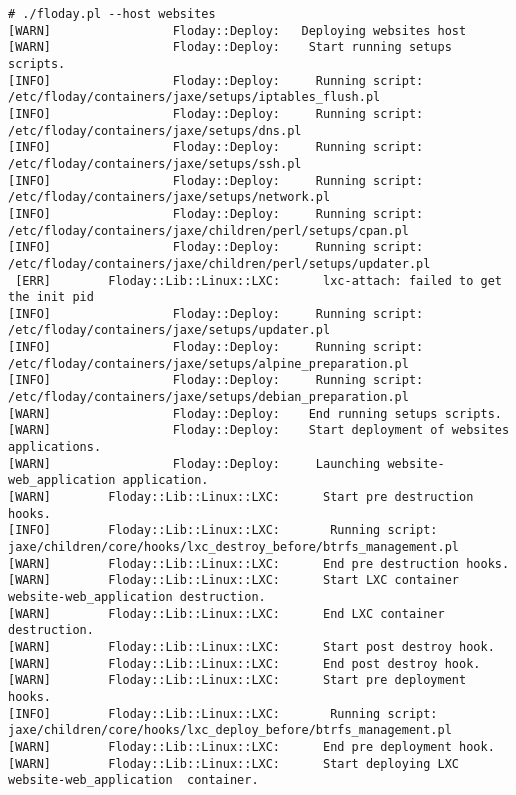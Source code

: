 \begin{lstlisting}[float=t, caption={Sortie d'une exécution de \emph{Floday}}, label=fig_1.4_floday, basicstyle=\tiny, xleftmargin=-3cm]
# ./floday.pl --host websites
[WARN]                 Floday::Deploy:   Deploying websites host
[WARN]                 Floday::Deploy:    Start running setups scripts.
[INFO]                 Floday::Deploy:     Running script: /etc/floday/containers/jaxe/setups/iptables_flush.pl
[INFO]                 Floday::Deploy:     Running script: /etc/floday/containers/jaxe/setups/dns.pl
[INFO]                 Floday::Deploy:     Running script: /etc/floday/containers/jaxe/setups/ssh.pl
[INFO]                 Floday::Deploy:     Running script: /etc/floday/containers/jaxe/setups/network.pl
[INFO]                 Floday::Deploy:     Running script: /etc/floday/containers/jaxe/children/perl/setups/cpan.pl
[INFO]                 Floday::Deploy:     Running script: /etc/floday/containers/jaxe/children/perl/setups/updater.pl
 [ERR]        Floday::Lib::Linux::LXC:      lxc-attach: failed to get the init pid
[INFO]                 Floday::Deploy:     Running script: /etc/floday/containers/jaxe/setups/updater.pl
[INFO]                 Floday::Deploy:     Running script: /etc/floday/containers/jaxe/setups/alpine_preparation.pl
[INFO]                 Floday::Deploy:     Running script: /etc/floday/containers/jaxe/setups/debian_preparation.pl
[WARN]                 Floday::Deploy:    End running setups scripts.
[WARN]                 Floday::Deploy:    Start deployment of websites applications.
[WARN]                 Floday::Deploy:     Launching website-web_application application.
[WARN]        Floday::Lib::Linux::LXC:      Start pre destruction hooks.
[INFO]        Floday::Lib::Linux::LXC:       Running script: jaxe/children/core/hooks/lxc_destroy_before/btrfs_management.pl
[WARN]        Floday::Lib::Linux::LXC:      End pre destruction hooks.
[WARN]        Floday::Lib::Linux::LXC:      Start LXC container website-web_application destruction.
[WARN]        Floday::Lib::Linux::LXC:      End LXC container destruction.
[WARN]        Floday::Lib::Linux::LXC:      Start post destroy hook.
[WARN]        Floday::Lib::Linux::LXC:      End post destroy hook.
[WARN]        Floday::Lib::Linux::LXC:      Start pre deployment hooks.
[INFO]        Floday::Lib::Linux::LXC:       Running script: jaxe/children/core/hooks/lxc_deploy_before/btrfs_management.pl
[WARN]        Floday::Lib::Linux::LXC:      End pre deployment hook.
[WARN]        Floday::Lib::Linux::LXC:      Start deploying LXC website-web_application  container.

\end{lstlisting}
